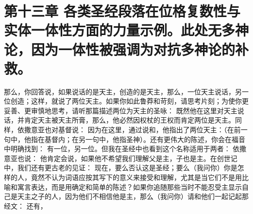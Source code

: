
\section{第十三章 各类圣经段落在位格复数性与实体一体性方面的力量示例。此处无多神论，因为一体性被强调为对抗多神论的补救。}

那么，你回答说，如果说话的是天主，创造的是天主，那么，一位天主说话，另一位创造；这样，就说了两位天主。如果你如此鲁莽和苛刻，请思考片刻；为使你更妥善、更审慎地思考，请听那篇描述两位为天主的圣咏： 既然他在这里对天主说话，并肯定天主被天主所膏，那么，他必然因权杖的王权而肯定两位是天主。同样，依撒意亚也对基督说： 因为在这里，通过说和，他指出了两位天主：（在前一句中，他指在基督内；在另一句中，他指圣神）。还有更伟大的陈述，你会在福音中明确找到：  有一位，另一位。但我在圣经中也看到这个名称适用于两者： 依撒意亚也说：  他肯定会说，如果他不希望我们理解父是主，子也是主。在创世记中，我们还有更古老的见证：  现在，要么否认这是圣经；要么（我问你）你是怎样的人，竟然不认为词语应按其写下的意义来接受和理解，尤其是当它们不是用比喻和寓言表达，而是用确定和简单的陈述？如果你追随那些当时不能忍受主显示自己是天主之子的人，因为他们不相信他是主，那么（我问你）请和他们一起记起那经文： 还有， 